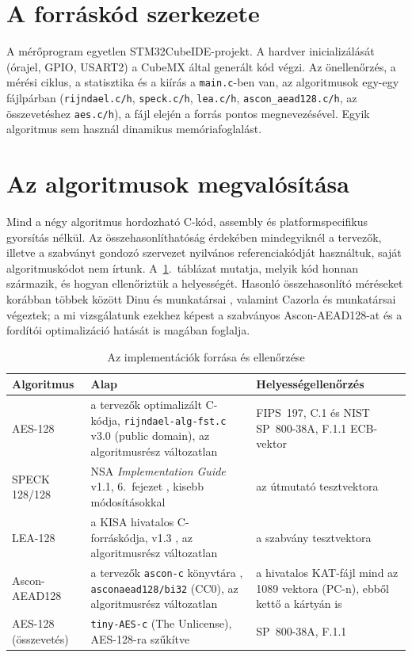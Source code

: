 \documentclass[a4paper,12pt]{report}
\theoremstyle{definition}
\theoremstyle{remark}
\begin{document}
\section{A forráskód szerkezete}

A mérőprogram egyetlen STM32CubeIDE-projekt. A hardver inicializálását (órajel, GPIO, USART2) a CubeMX által generált kód végzi. Az önellenőrzés, a mérési ciklus, a statisztika és a kiírás a \texttt{main.c}-ben van, az algoritmusok egy-egy fájlpárban (\texttt{rijndael.c/h}, \texttt{speck.c/h}, \texttt{lea.c/h}, \texttt{ascon\_aead128.c/h}, az összevetéshez \texttt{aes.c/h}), a fájl elején a forrás pontos megnevezésével. Egyik algoritmus sem használ dinamikus memóriafoglalást.

\section{Az algoritmusok megvalósítása}\label{sec:megvalositas}

Mind a négy algoritmus hordozható C-kód, assembly és platformspecifikus gyorsítás nélkül. Az összehasonlíthatóság érdekében mindegyiknél a tervezők, illetve a szabványt gondozó szervezet nyilvános referenciakódját használtuk, saját algoritmuskódot nem írtunk. A~\ref{tab:forrasok}.~táblázat mutatja, melyik kód honnan származik, és hogyan ellenőriztük a helyességét. Hasonló összehasonlító méréseket korábban többek között Dinu és munkatársai \cite{Dinu2015}, valamint Cazorla és munkatársai \cite{Cazorla2013} végeztek; a mi vizsgálatunk ezekhez képest a szabványos Ascon-AEAD128-at és a fordítói optimalizáció hatását is magában foglalja.

\begin{table}[htbp]
    \centering
    \small
    \caption{Az implementációk forrása és ellenőrzése}
    \label{tab:forrasok}
    \begin{tabularx}{\textwidth}{|l|X|X|}
        \hline
        \textbf{Algoritmus} & \textbf{Alap} & \textbf{Helyességellenőrzés} \\ \hline
        AES-128 & a tervezők optimalizált C-kódja, \texttt{rijndael-alg-fst.c} v3.0 \cite{RijndaelFst} (public domain), az algoritmusrész változatlan & FIPS~197, C.1 \cite{FIPS197} és NIST SP~800-38A, F.1.1 ECB-vektor \cite{SP80038A} \\ \hline
        SPECK 128/128 & NSA \emph{Implementation Guide} v1.1, 6.~fejezet \cite{Beaulieu2019}, kisebb módosításokkal & az útmutató tesztvektora \\ \hline
        LEA-128 & a KISA hivatalos C-forráskódja, v1.3 \cite{KISALEAsrc}, az algoritmusrész változatlan & a szabvány tesztvektora \cite{KISALEA} \\ \hline
        Ascon-AEAD128 & a tervezők \texttt{ascon-c} könyvtára \cite{AsconC}, \texttt{asconaead128/bi32} (CC0), az algoritmusrész változatlan & a hivatalos KAT-fájl mind az 1089 vektora (PC-n), ebből kettő a kártyán is \\ \hline
        AES-128 (összevetés) & \texttt{tiny-AES-c} \cite{TinyAES} (The Unlicense), AES-128-ra szűkítve & SP~800-38A, F.1.1 \\ \hline
    \end{tabularx}
\end{table}
\end{document}
